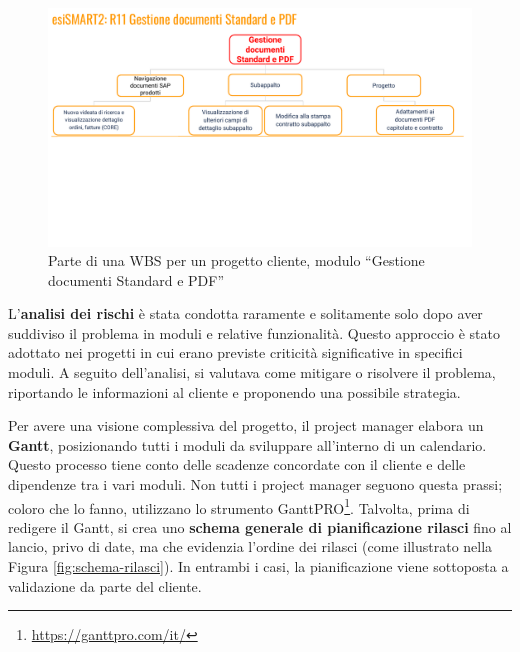         \begin{figure}
            \centering
            \includegraphics[width=\linewidth]{figures/esismartWBS.pdf}
            \caption{Parte di una WBS per un progetto cliente, modulo “Gestione documenti Standard e PDF”}
            \label{fig:wbs-esismart}
        \end{figure}

        L'\textbf{analisi dei rischi} è stata condotta raramente e solitamente solo dopo aver suddiviso il problema in moduli
        e relative funzionalità. Questo approccio è stato adottato nei progetti in cui erano previste criticità significative in specifici moduli.
        A seguito dell'analisi, si valutava come mitigare o risolvere il problema, riportando le informazioni al cliente e proponendo una possibile strategia.

        Per avere una visione complessiva del progetto, il project manager elabora un \textbf{Gantt}, posizionando tutti i moduli da sviluppare all'interno di un
        calendario. Questo processo tiene conto delle scadenze concordate con il cliente e delle dipendenze tra i vari moduli. Non tutti i project manager
        seguono questa prassi; coloro che lo fanno, utilizzano lo strumento GanttPRO\footnote{\url{https://ganttpro.com/it/}}. Talvolta, prima di redigere il Gantt, si crea uno \textbf{schema generale di pianificazione
        rilasci} fino al lancio, privo di date, ma che evidenzia l’ordine dei rilasci (come illustrato nella Figura \ref{fig:schema-rilasci}). In entrambi i casi, la pianificazione
        viene sottoposta a validazione da parte del cliente.

